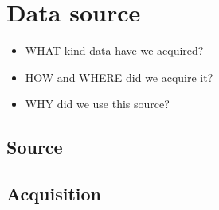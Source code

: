 \section{Data source}
\begin{itemize}
\item WHAT kind data have we acquired?
\item HOW and WHERE did we acquire it?
\item WHY did we use this source?
\end{itemize}

\subsection{Source}

\subsection{Acquisition}